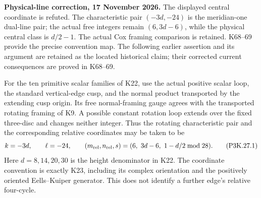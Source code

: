 \begin{theorem}\label{night:P3K.27}
\par\noindent\textbf{Physical-line correction, 17 November 2026.} The displayed central coordinate is refuted. The characteristic pair \((-3d,-24)\) is the meridian-one dual-line pair; the actual free integers remain \((6,3d-6)\), while the physical central class is \(d/2-1\). The actual Cox framing comparison is retained. K68--69 provide the precise convention map. The following earlier assertion and its argument are retained as the located historical claim; their corrected current consequences are proved in K68--69.\medskip\par 
For the ten primitive scalar families of K22, use the actual
positive scalar loop, the standard vertical-edge cusp, and the
normal product transported by the extending cusp origin. Its
free normal-framing gauge agrees with the transported rotating
framing of K9. A possible constant rotation loop extends over
the fixed three-disc and changes neither integer. Thus the
rotating characteristic pair and the corresponding relative
coordinates may be taken to be
\[
       k=-3d,\qquad \ell=-24,\qquad
       (m_{\rm rel},n_{\rm rel},s)
             =(6,\ 3d-6,\ 1-d/2\bmod28).
                                                        \tag{P3K.27.1}
\]
Here \(d=8,14,20,30\) is the height denominator in K22. The
coordinate convention is exactly K23, including its complex
orientation and the positively oriented Eells--Kuiper generator.
This does not identify a further edge's relative four-cycle.
\end{theorem}
